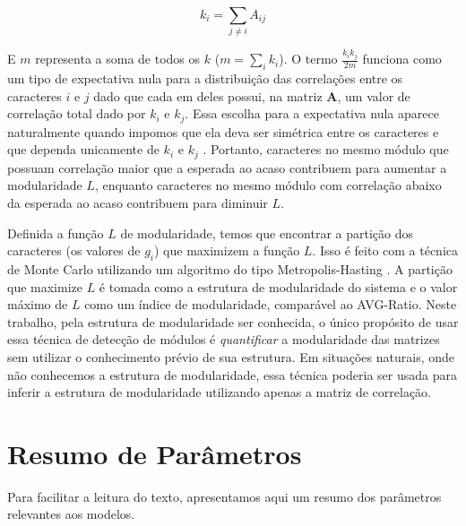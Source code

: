 \begin{equation}
   k_i = \sum_{j \neq i} A_{ij}
\end{equation}

E $m$ representa a soma de todos os $k$ ($m=\sum_i k_i$).
O termo $\frac{k_ik_j}{2m}$ funciona como um tipo de expectativa nula
para a distribuição das correlações entre os caracteres $i$ e $j$ dado que
cada em deles possui, na matriz $\mathbf{A}$, um valor de correlação total
dado por $k_i$ e $k_j$.
Essa escolha para a expectativa nula aparece naturalmente quando
impomos que ela deva ser simétrica entre os caracteres e que dependa
unicamente de $k_i$ e $k_j$ \citep[Para detalhes veja][]{Newman2006a}.
Portanto, caracteres no mesmo módulo que possuam correlação maior que a
esperada ao acaso contribuem para aumentar a modularidade $L$, enquanto
caracteres no mesmo módulo com correlação abaixo da esperada ao acaso
contribuem para diminuir $L$.

Definida a função $L$ de modularidade, temos que encontrar a partição
dos caracteres (os valores de $g_i$) que maximizem a função $L$.
Isso é feito com a técnica de Monte Carlo utilizando um algoritmo
do tipo Metropolis-Hasting \citep{Metropolis1953}.
A partição que maximize $L$ é tomada como a estrutura de modularidade do
sistema e o valor máximo de $L$ como um índice de modularidade,
comparável ao AVG-Ratio.
Neste trabalho, pela estrutura de modularidade ser conhecida, o único propósito 
de usar essa técnica de detecção de módulos é {\it quantificar} a 
modularidade das matrizes sem utilizar o conhecimento prévio de sua
estrutura.
Em situações naturais, onde não conhecemos a estrutura de modularidade,
essa técnica poderia ser usada para inferir a estrutura de modularidade
utilizando apenas a matriz de correlação.

\newpage
\section{Resumo de Parâmetros}

Para facilitar a leitura do texto, apresentamos aqui um resumo dos
parâmetros relevantes aos modelos.

